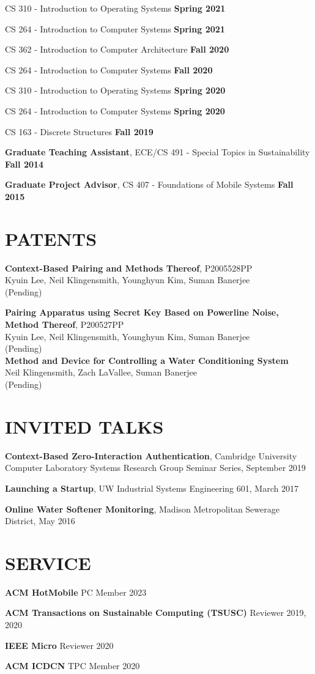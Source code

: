 \documentclass{res}
\begin{document}
\begin{resume}
CS 310 - Introduction to Operating Systems
\hfill \textbf{Spring 2021}

CS 264 - Introduction to Computer Systems
\hfill \textbf{Spring 2021}


CS 362 - Introduction to Computer Architecture
\hfill \textbf{Fall 2020}


CS 264 - Introduction to Computer Systems
\hfill \textbf{Fall 2020}


CS 310 - Introduction to Operating Systems
\hfill \textbf{Spring 2020}

CS 264 - Introduction to Computer Systems
\hfill \textbf{Spring 2020}

CS 163 - Discrete Structures
\hfill \textbf{Fall 2019}


\textbf{Graduate Teaching Assistant},
ECE/CS 491 - Special Topics in Sustainability
\hfill \textbf{Fall 2014}

\textbf{Graduate Project Advisor},
CS 407 - Foundations of Mobile Systems
\hfill \textbf{Fall 2015}


\section{PATENTS}

      {\bf Context-Based Pairing and Methods Thereof}, P2005528PP \\
      Kyuin Lee, Neil Klingensmith, Younghyun Kim, Suman Banerjee \\
      (Pending)

      {\bf Pairing Apparatus using Secret Key Based on Powerline Noise, Method Thereof}, P200527PP \\
      Kyuin Lee, Neil Klingensmith, Younghyun Kim, Suman Banerjee \\
      (Pending) \\

      {\bf Method and Device for Controlling a Water Conditioning System} \\
      Neil Klingensmith, Zach LaVallee, Suman Banerjee \\
      (Pending) \\


\section{INVITED TALKS}

    {\bf Context-Based Zero-Interaction Authentication}, Cambridge University Computer Laboratory Systems Research Group Seminar Series, September 2019

    {\bf Launching a Startup}, UW Industrial Systems Engineering 601, March 2017

    {\bf Online Water Softener Monitoring}, Madison Metropolitan Sewerage District, May 2016

\end{resume}

\section {SERVICE}

    {\bf ACM HotMobile} PC Member 2023

    {\bf ACM Transactions on Sustainable Computing (TSUSC)} Reviewer 2019, 2020

    {\bf IEEE Micro} Reviewer 2020

    {\bf ACM ICDCN} TPC Member 2020
\end{document}
